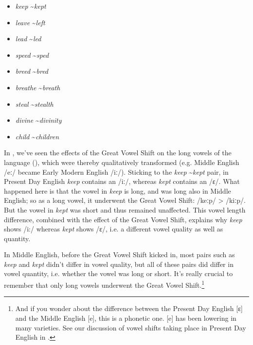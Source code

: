 \begin{multicols}{2}
\begin{itemize}
    \item \textit{keep} \textasciitilde \textit{kept}
    \item \textit{leave} \textasciitilde \textit{left}
    \item \textit{lead} \textasciitilde \textit{led}
    \item \textit{speed} \textasciitilde \textit{sped}
    \item \textit{breed} \textasciitilde \textit{bred}
    \item \textit{breathe} \textasciitilde \textit{breath}
    \item \textit{steal} \textasciitilde \textit{stealth}
    \item \textit{divine} \textasciitilde \textit{divinity}
    \item \textit{child} \textasciitilde \textit{children}
\end{itemize}
\end{multicols}

\noindent In , we've seen the effects of the Great Vowel Shift on the long vowels of the language (), which were thereby qualitatively transformed (e.g. Middle English /eː/ became Early Modern English /iː/). Sticking to the \textit{keep} \textasciitilde \textit{kept} pair, in Present Day English \textit{keep} contains an /iː/, whereas \textit{kept} contains an /ɛ/. What happened here is that the vowel in \textit{keep} is long, and was long also in Middle English; so as a long vowel, it underwent the Great Vowel Shift: /keːp/ > /kiːp/. But the vowel in \textit{kept} was short and thus remained unaffected. This vowel length difference, combined with the effect of the Great Vowel Shift, explains why \emph{keep} shows /i:/ whereas \emph{kept} shows /ɛ/, i.e. a different vowel quality as well as quantity.

In Middle English, before the Great Vowel Shift kicked in, most pairs such as \emph{keep} and \emph{kept} didn't differ in vowel quality, but all of these pairs did differ in vowel quantity, i.e. whether the vowel was long or short. It's really crucial to remember that only long vowels underwent the Great Vowel Shift.\footnote{And if you wonder about the difference between the Present Day English [ɛ] and the Middle English [e], this is a phonetic one. [e] has been lowering in many varieties. See our discussion of vowel shifts taking place in Present Day English in .}


